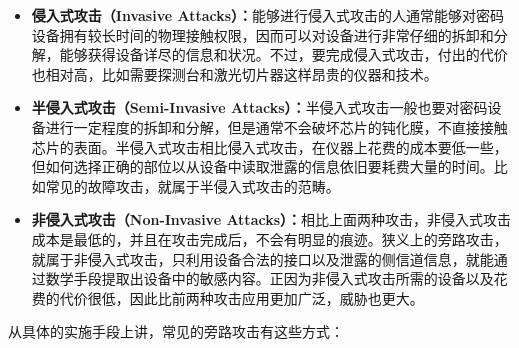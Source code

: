 \begin{itemize}
\item \textbf{侵入式攻击（Invasive Attacks）：}能够进行侵入式攻击的人通常能够对密码设备拥有较长时间的物理接触权限，因而可以对设备进行非常仔细的拆卸和分解，能够获得设备详尽的信息和状况。不过，要完成侵入式攻击，付出的代价也相对高，比如需要探测台和激光切片器这样昂贵的仪器和技术。

\item \textbf{半侵入式攻击（Semi-Invasive Attacks）：}半侵入式攻击一般也要对密码设备进行一定程度的拆卸和分解，但是通常不会破坏芯片的钝化膜，不直接接触芯片的表面。半侵入式攻击相比侵入式攻击，在仪器上花费的成本要低一些，但如何选择正确的部位以从设备中读取泄露的信息依旧要耗费大量的时间。比如常见的故障攻击，就属于半侵入式攻击的范畴。

\item \textbf{非侵入式攻击（Non-Invasive Attacks）：}相比上面两种攻击，非侵入式攻击成本是最低的，并且在攻击完成后，不会有明显的痕迹。狭义上的旁路攻击，就属于非侵入式攻击，只利用设备合法的接口以及泄露的侧信道信息，就能通过数学手段提取出设备中的敏感内容。正因为非侵入式攻击所需的设备以及花费的代价很低，因此比前两种攻击应用更加广泛，威胁也更大。
\end{itemize}

\vspace*{0.5\baselineskip}

从具体的实施手段上讲，常见的旁路攻击有这些方式： \cite{sca_ten_year}

